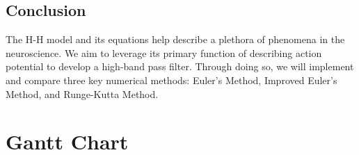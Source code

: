 \documentclass{article} %
\begin{document}
\begin{multicols}{2}
\section{Conclusion}

The H-H model and its equations help describe a plethora of phenomena in the neuroscience.
We aim to leverage its primary function of describing action potential to develop a high-band pass filter.
Through doing so, we will implement and compare three key numerical methods: Euler's Method, Improved Euler's Method, and Runge-Kutta Method.

\label{last_page}

\newpage




\end{multicols}

\newpage
\appendix

\section{Gantt Chart}
\label{app: appendix_a}
\end{document}
